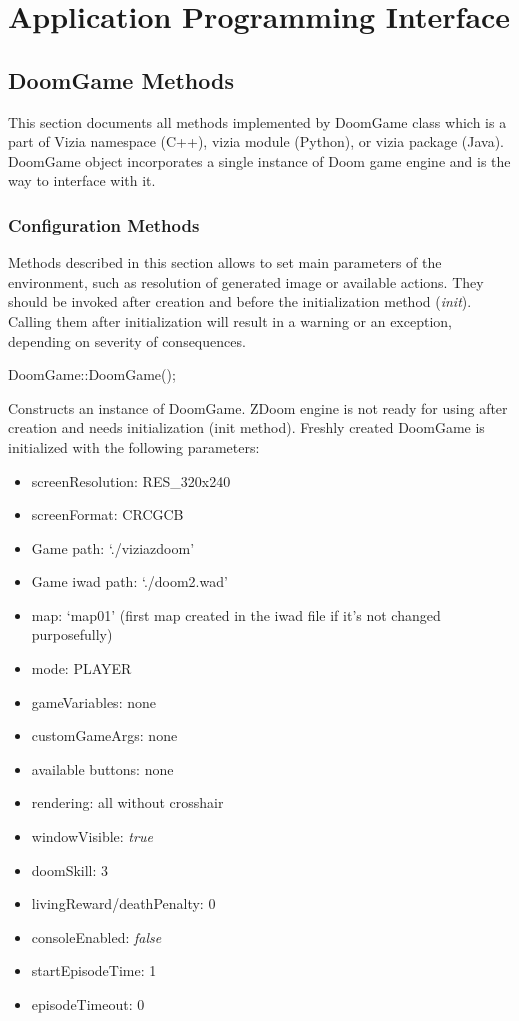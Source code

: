 \chapter{Application Programming Interface}\label{ch:api}
\section{DoomGame Methods}\label{sec:methods}
	This section documents all methods implemented by DoomGame class which is a part of Vizia namespace (C++), vizia module (Python), or vizia package (Java). DoomGame object incorporates a single instance of Doom game engine and is the way to interface with it.
	\subsection{Configuration Methods}\label{subsec:config_methods}
	Methods described in this section allows to set main parameters of the environment, such as resolution of generated image or available actions. They should be invoked after creation and before the initialization method (\emph{init}). Calling them after initialization will result in a warning or an exception, depending on severity of consequences. 
	\vspace{20pt}

\begin{clinee}
DoomGame::DoomGame();
\end{clinee}

	Constructs an instance of DoomGame. ZDoom engine is not ready for using after creation and needs initialization (init method). Freshly created DoomGame is initialized with the following parameters:
	\begin{itemize}
		\item screenResolution: RES\_320x240
		\item screenFormat: CRCGCB
		\item Game path: `./viziazdoom'
		\item Game iwad path: `./doom2.wad'
		\item map: `map01' (first map created in the iwad file if it's not changed purposefully)
		\item mode: PLAYER
		\item gameVariables: none
		\item customGameArgs: none
		\item available buttons: none
		\item rendering: all without crosshair
		\item windowVisible: \emph{true} 
		\item doomSkill: 3
		\item livingReward/deathPenalty: 0
		\item consoleEnabled: \emph{false}
		\item startEpisodeTime: 1
		\item episodeTimeout: 0
	\end{itemize}

